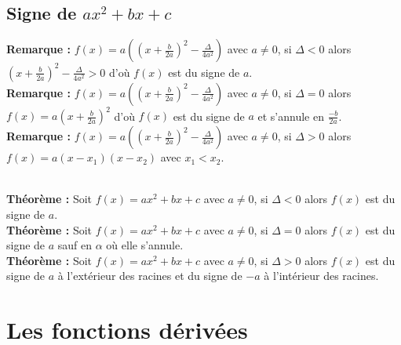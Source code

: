 \documentclass[a4paper,titlepage]{article}
\makeatletter
\let\oldsection\section
\renewcommand\section{\clearpage\oldsection}
\def\tikzscale{1}\begin{lrbox}{\measure@tikzpicture}
\edef\tikzscale{\pgfmathresult}
\makeatother
\begin{document}
    \subsection[Signe de $ax^{2}+bx+c$]{\boldmath Signe de $ax^{2}+bx+c$}
        \textbf{Remarque :} $f\left(x\right)=a\left(\left(x+\frac{b}{2a}\right)^{2}-\frac{\varDelta}{4a^{2}}\right)$ avec $a\neq0$, si $\varDelta<0$ alors $\left(x+\frac{b}{2a}\right)^{2}-\frac{\varDelta}{4a^2}>0$ d’où $f\left(x\right)$ est du signe de $a$.\\
        \textbf{Remarque :} $f\left(x\right)=a\left(\left(x+\frac{b}{2a}\right)^{2}-\frac{\varDelta}{4a^{2}}\right)$ avec $a\neq0$, si $\varDelta=0$ alors $f\left(x\right)=a\left(x+\frac{b}{2a}\right)^{2}$ d’où $f\left(x\right)$ est du signe de $a$ et s’annule en $\frac{-b}{2a}$.\\
        \textbf{Remarque :} $f\left(x\right)=a\left(\left(x+\frac{b}{2a}\right)^{2}-\frac{\varDelta}{4a^{2}}\right)$ avec $a\neq0$, si $\varDelta>0$ alors $f\left(x\right)=a(x-x_{1})(x-x_{2})$ avec $x_{1}<x_{2}$.
        \\
        \begin{scaletikzpicturetowidth}{\textwidth}
        \end{scaletikzpicturetowidth}
        \\
        \textbf{Théorème :} Soit $f\left(x\right)=ax^{2}+bx+c$ avec $a\neq0$, si $\varDelta<0$ alors $f\left(x\right)$ est du signe de $a$.
        \\
        \textbf{Théorème :} Soit $f\left(x\right)=ax^{2}+bx+c$ avec $a\neq0$, si $\varDelta=0$ alors $f\left(x\right)$ est du signe de $a$ sauf en $\alpha$ où elle s’annule.
        \\
        \textbf{Théorème :} Soit $f\left(x\right)=ax^{2}+bx+c$ avec $a\neq0$, si $\varDelta>0$ alors $f\left(x\right)$ est du signe de $a$ à l’extérieur des racines et du signe de $-a$ à l’intérieur des racines.
\section{Les fonctions dérivées}
\end{document}
